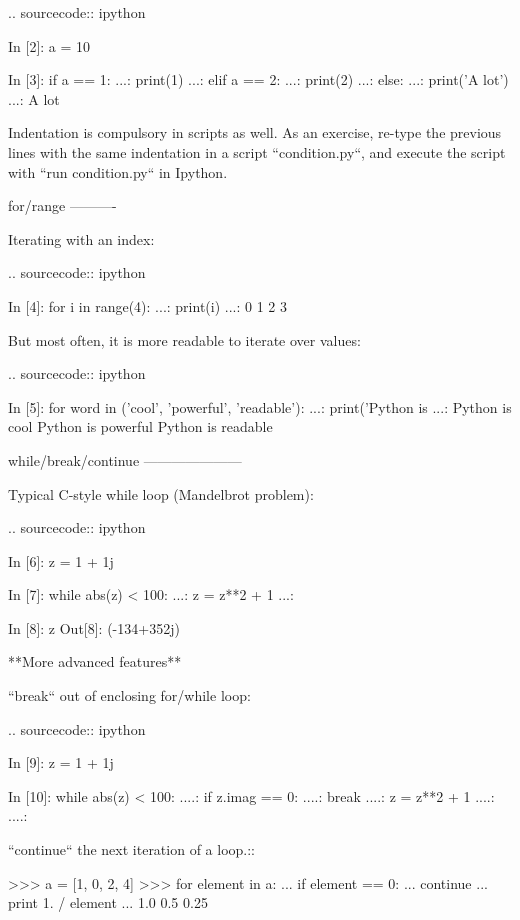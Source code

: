 \documentclass[a4paper,11pt]{extarticle}
\begin{document}
.. sourcecode:: ipython

    In [2]: a = 10
    
    In [3]: if a == 1:
       ...:     print(1)
       ...: elif a == 2:
       ...:     print(2)
       ...: else:
       ...:     print('A lot')
       ...: 
    A lot

Indentation is compulsory in scripts as well. As an exercise, re-type the
previous lines with the same indentation in a script ``condition.py``, and
execute the script with ``run condition.py`` in Ipython.

for/range
----------

Iterating with an index:

.. sourcecode:: ipython

    In [4]: for i in range(4):
       ...:     print(i)
       ...: 
    0
    1
    2
    3

But most often, it is more readable to iterate over values:

.. sourcecode:: ipython

    In [5]: for word in ('cool', 'powerful', 'readable'):
       ...:     print('Python is %
       ...: 
    Python is cool
    Python is powerful
    Python is readable


while/break/continue
---------------------

Typical C-style while loop (Mandelbrot problem):

.. sourcecode:: ipython

    In [6]: z = 1 + 1j

    In [7]: while abs(z) < 100:
       ...:     z = z**2 + 1
       ...:     

    In [8]: z
    Out[8]: (-134+352j)

**More advanced features**

``break`` out of enclosing for/while loop:

.. sourcecode:: ipython

    In [9]: z = 1 + 1j

    In [10]: while abs(z) < 100:
       ....:     if z.imag == 0:
       ....:         break
       ....:     z = z**2 + 1
       ....:     
       ....:     


``continue`` the next iteration of a loop.::

    >>> a = [1, 0, 2, 4]
    >>> for element in a:
    ...     if element == 0:
    ...         continue
    ...     print 1. / element
    ...     
    1.0
    0.5
    0.25
\end{document}
